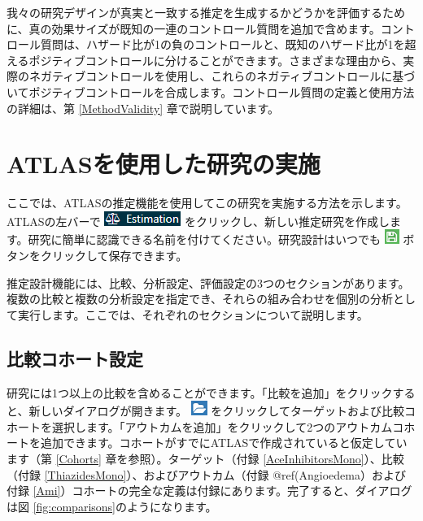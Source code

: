 \documentclass[
  11pt]{book}
\theoremstyle{definition}
\theoremstyle{definition}
\theoremstyle{definition}
\theoremstyle{definition}
\theoremstyle{remark}
\begin{document}
我々の研究デザインが真実と一致する推定を生成するかどうかを評価するために、真の効果サイズが既知の一連のコントロール質問を追加で含めます。コントロール質問は、ハザード比が1の負のコントロールと、既知のハザード比が1を超えるポジティブコントロールに分けることができます。さまざまな理由から、実際のネガティブコントロールを使用し、これらのネガティブコントロールに基づいてポジティブコントロールを合成します。コントロール質問の定義と使用方法の詳細は、第 \ref{MethodValidity} 章で説明しています。

\section{ATLASを使用した研究の実施}\label{PleAtlas}

ここでは、ATLASの推定機能を使用してこの研究を実施する方法を示します。ATLASの左バーで \includegraphics{images/PopulationLevelEstimation/estimation.png} をクリックし、新しい推定研究を作成します。研究に簡単に認識できる名前を付けてください。研究設計はいつでも \includegraphics{images/PopulationLevelEstimation/save.png} ボタンをクリックして保存できます。

推定設計機能には、比較、分析設定、評価設定の3つのセクションがあります。複数の比較と複数の分析設定を指定でき、それらの組み合わせを個別の分析として実行します。ここでは、それぞれのセクションについて説明します。

\subsection{比較コホート設定}\label{ComparisonSettings}

研究には1つ以上の比較を含めることができます。「比較を追加」をクリックすると、新しいダイアログが開きます。 \includegraphics{images/PopulationLevelEstimation/open.png} をクリックしてターゲットおよび比較コホートを選択します。「アウトカムを追加」をクリックして2つのアウトカムコホートを追加できます。コホートがすでにATLASで作成されていると仮定しています（第 \ref{Cohorts} 章を参照）。ターゲット（付録 \ref{AceInhibitorsMono}）、比較（付録 \ref{ThiazidesMono}）、およびアウトカム（付録 @ref(Angioedema）および付録 \ref{Ami}）コホートの完全な定義は付録にあります。完了すると、ダイアログは図 \ref{fig:comparisons}のようになります。
\end{document}
